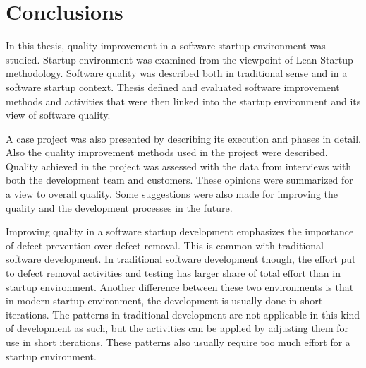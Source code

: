 
 \chapter{Conclusions}

 
 In this thesis, quality improvement in a software startup environment was studied. Startup environment was examined from the viewpoint of Lean Startup methodology. Software quality was described both in traditional sense and in a software startup context. Thesis defined and evaluated software improvement methods and activities that were then linked into the startup environment and its view of software quality.

 A case project was also presented by describing its execution and phases in detail. Also the quality improvement methods used in the project were described. Quality achieved in the project was assessed with the data from interviews with both the development team and customers. These opinions were summarized for a view to overall quality. Some suggestions were also made for improving the quality and the development processes in the future.



Improving quality in a software startup development emphasizes the importance of defect prevention over defect removal. This is common with traditional software development. In traditional software development though, the effort put to defect removal activities and testing has larger share of total effort than in startup environment. Another difference between these two environments is that in modern startup environment, the development is usually done in short iterations. The patterns in traditional development are not applicable in this kind of development as such, but the activities can be applied by adjusting them for use in short iterations. These patterns also usually require too much effort for a startup environment.

